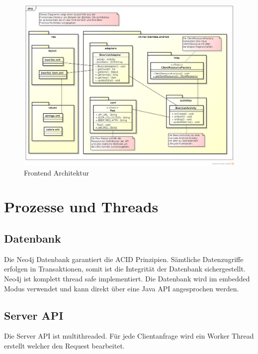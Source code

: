 \documentclass[10pt,a4paper]{scrartcl}
\begin{document}
\begin{figure}[H]
	\includegraphics[height=\textwidth,angle=90]{FrontendArchitektur.png}
	\caption{Frontend Architektur}
	\label{fig:frontend_architecture}
\end{figure}


\section{Prozesse und Threads}

\subsection{Datenbank}

Die Neo4j Datenbank garantiert die ACID Prinzipien.
Sämtliche Datenzugriffe erfolgen in Transaktionen, somit ist die Integrität der Datenbank
sichergestellt.
Neo4j ist komplett thread safe implementiert.  Die Datenbank wird im
embedded Modus verwendet und kann direkt über eine Java API angesprochen werden.

\subsection{Server API}

Die Server API ist multithreaded. Für jede Clientanfrage wird ein Worker Thread erstellt welcher den
Request bearbeitet.
\end{document}
